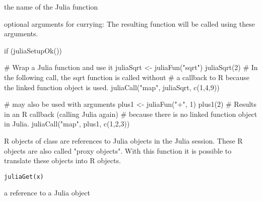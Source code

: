 %
\begin{Arguments}
\begin{ldescription}
\item[\code{name}] the name of the Julia function

\item[\code{...}] optional arguments for currying:
The resulting function will be called using these arguments.
\end{ldescription}
\end{Arguments}
%
\begin{Examples}
\begin{ExampleCode}
if (juliaSetupOk()) {

   # Wrap a Julia function and use it
   juliaSqrt <- juliaFun("sqrt")
   juliaSqrt(2)
   # In the following call, the sqrt function is called without
   # a callback to R because the linked function object is used.
   juliaCall("map", juliaSqrt, c(1,4,9))

   # may also be used with arguments
   plus1 <- juliaFun("+", 1)
   plus1(2)
   # Results in an R callback (calling Julia again)
   # because there is no linked function object in Julia.
   juliaCall("map", plus1, c(1,2,3))

}


\end{ExampleCode}
\end{Examples}
%
\begin{Description}\relax
R objects of class  are references to Julia objects in the Julia session.
These R objects are also called "proxy objects".
With this function it is possible to translate these objects into R objects.
\end{Description}
%
\begin{Usage}
\begin{verbatim}
juliaGet(x)
\end{verbatim}
\end{Usage}
%
\begin{Arguments}
\begin{ldescription}
\item[\code{x}] a reference to a Julia object
\end{ldescription}
\end{Arguments}
%

